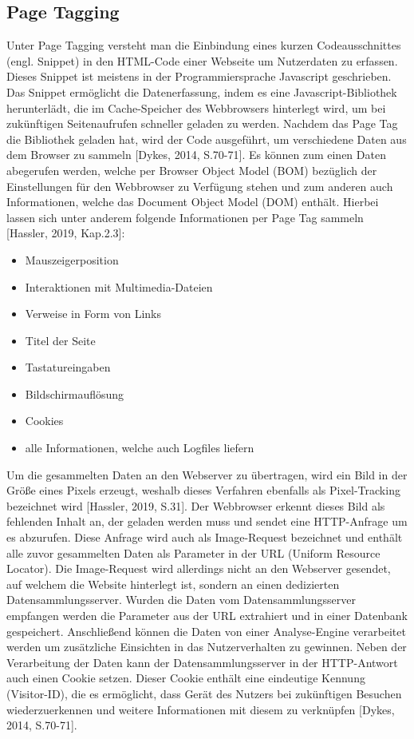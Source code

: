 \subsection{Page Tagging}
Unter Page Tagging versteht man die Einbindung eines kurzen Codeausschnittes (engl. Snippet) in den HTML-Code einer Webseite um Nutzerdaten zu erfassen. Dieses Snippet ist meistens in der Programmiersprache Javascript geschrieben. Das Snippet ermöglicht die Datenerfassung, indem es eine Javascript-Bibliothek herunterlädt, die im Cache-Speicher des Webbrowsers hinterlegt wird, um bei zukünftigen Seitenaufrufen schneller geladen zu werden. Nachdem das Page Tag die Bibliothek geladen hat, wird der Code ausgeführt, um verschiedene Daten aus dem Browser zu sammeln [Dykes, 2014, S.70-71]. Es können zum einen Daten abegerufen werden, welche per Browser Object Model (BOM) bezüglich der Einstellungen für den Webbrowser zu Verfügung stehen und zum anderen auch Informationen, welche das Document Object Model (DOM) enthält. Hierbei lassen sich unter anderem folgende Informationen per Page Tag sammeln [Hassler, 2019, Kap.2.3]:  

\begin{itemize}
    \item Mauszeigerposition
    \item Interaktionen mit Multimedia-Dateien
    \item Verweise in Form von Links
    \item Titel der Seite
    \item Tastatureingaben
    \item Bildschirmauflösung
    \item Cookies
    \item alle Informationen, welche auch Logfiles liefern
\end{itemize}

Um die gesammelten Daten an den Webserver zu übertragen, wird ein Bild in der Größe eines Pixels erzeugt, weshalb dieses Verfahren ebenfalls als Pixel-Tracking bezeichnet wird [Hassler, 2019, S.31]. Der Webbrowser erkennt dieses Bild als fehlenden Inhalt an, der geladen werden muss und sendet eine HTTP-Anfrage um es abzurufen. Diese Anfrage wird auch als Image-Request bezeichnet und enthält alle zuvor gesammelten Daten als Parameter in der URL (Uniform Resource Locator). Die Image-Request wird allerdings nicht an den Webserver gesendet, auf welchem die Website hinterlegt ist, sondern an einen dedizierten Datensammlungsserver. Wurden die Daten vom Datensammlungsserver empfangen werden die Parameter aus der URL extrahiert und in einer Datenbank gespeichert. Anschließend können die Daten von einer Analyse-Engine verarbeitet werden um zusätzliche Einsichten in das Nutzerverhalten zu gewinnen. Neben der Verarbeitung der Daten kann der Datensammlungsserver in der HTTP-Antwort auch einen Cookie setzen. Dieser Cookie enthält eine eindeutige Kennung (Visitor-ID), die es ermöglicht, dass Gerät des Nutzers bei zukünftigen Besuchen wiederzuerkennen und weitere Informationen mit diesem zu verknüpfen [Dykes, 2014, S.70-71].

